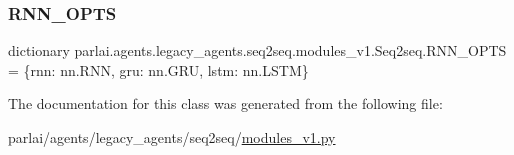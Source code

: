 \subsubsection{\texorpdfstring{R\+N\+N\+\_\+\+O\+P\+TS}{RNN\_OPTS}}
{\footnotesize\ttfamily dictionary parlai.\+agents.\+legacy\+\_\+agents.\+seq2seq.\+modules\+\_\+v1.\+Seq2seq.\+R\+N\+N\+\_\+\+O\+P\+TS = \{\textquotesingle{}rnn\textquotesingle{}\+: nn.\+R\+NN, \textquotesingle{}gru\textquotesingle{}\+: nn.\+G\+RU, \textquotesingle{}lstm\textquotesingle{}\+: nn.\+L\+S\+TM\}\hspace{0.3cm}{\ttfamily [static]}}



The documentation for this class was generated from the following file\+:\begin{DoxyCompactItemize}
\item 
parlai/agents/legacy\+\_\+agents/seq2seq/\hyperlink{modules__v1_8py}{modules\+\_\+v1.\+py}\end{DoxyCompactItemize}
